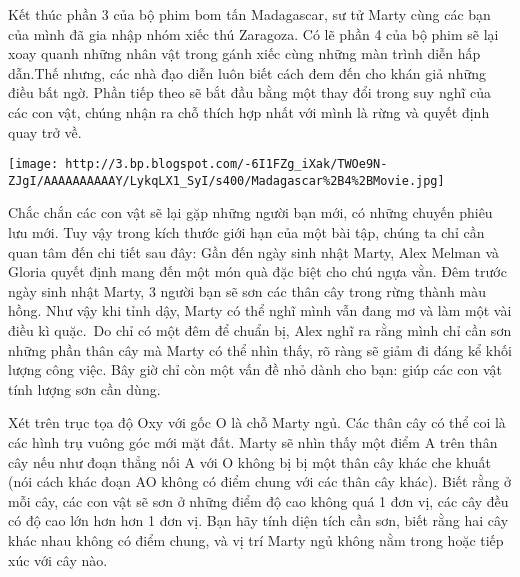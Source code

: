 Kết thúc phần 3 của bộ phim bom tấn Madagascar, sư tử Marty cùng các bạn của mình đã gia nhập nhóm xiếc thú Zaragoza. Có lẽ phần 4 của bộ phim sẽ lại xoay quanh những nhân vật trong gánh xiếc cùng những màn trình diễn hấp dẫn.Thế nhưng, các nhà đạo diễn luôn biết cách đem đến cho khán giả những điều bất ngờ. Phần tiếp theo sẽ bắt đầu bằng một thay đổi trong suy nghĩ của các con vật, chúng nhận ra chỗ thích hợp nhất với mình là rừng và quyết định quay trở về.


\texttt{[image: http://3.bp.blogspot.com/-6I1FZg\_iXak/TWOe9N-ZJgI/AAAAAAAAAAY/LykqLX1\_SyI/s400/Madagascar\%2B4\%2BMovie.jpg]}

Chắc chắn các con vật sẽ lại gặp những người bạn mới, có những chuyến phiêu lưu mới. Tuy vậy trong kích thước giới hạn của một bài tập, chúng ta chỉ cần quan tâm đến chi tiết sau đây: Gần đến ngày sinh nhật Marty, Alex Melman và Gloria quyết định mang đến một món quà đặc biệt cho chú ngựa vằn. Đêm trước ngày sinh nhật Marty, 3 người bạn sẽ sơn các thân cây trong rừng thành màu hồng. Như vậy khi tỉnh dậy, Marty có thể nghĩ mình vẫn đang mơ và làm một vài điều kì quặc. Do chỉ có một đêm để chuẩn bị, Alex nghĩ ra rằng mình chỉ cần sơn những phần thân cây mà Marty có thể nhìn thấy, rõ ràng sẽ giảm đi đáng kể khối lượng công việc. Bây giờ chỉ còn một vấn đề nhỏ dành cho bạn: giúp các con vật tính lượng sơn cần dùng.

Xét trên trục tọa độ Oxy với gốc O là chỗ Marty ngủ. Các thân cây có thể coi là các hình trụ vuông góc mới mặt đất. Marty sẽ nhìn thấy một điểm A trên thân cây nếu như đoạn thẳng nối A với O không bị bị một thân cây khác che khuất (nói cách khác đoạn AO không có điểm chung với các thân cây khác). Biết rằng ở mỗi cây, các con vật sẽ sơn ở những điểm độ cao không quá 1 đơn vị, các cây đều có độ cao lớn hơn hơn 1 đơn vị. Bạn hãy tính diện tích cần sơn, biết rằng hai cây khác nhau không có điểm chung, và vị trí Marty ngủ không nằm trong hoặc tiếp xúc với cây nào.